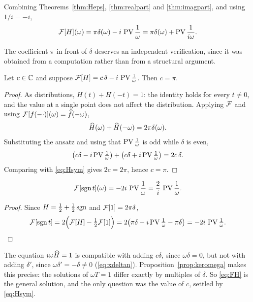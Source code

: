 Combining Theorems~\ref{thm:Heps}, \ref{thm:realpart} and \ref{thm:imagpart}, and using
$1/i=-i$,
\begin{equation}
\mathcal{F}[H](\omega)=\pi\delta(\omega)-i\,\operatorname{PV}\frac{1}{\omega}
=\pi\delta(\omega)+\operatorname{PV}\frac{1}{i\omega} .
\label{eq:FH}
\end{equation}

The coefficient $\pi$ in front of $\delta$ deserves an independent verification, since it was
obtained from a computation rather than from a structural argument.

\begin{theorem}\label{thm:symcoef}
Let $c\in\mathbb{C}$ and suppose $\mathcal{F}[H]=c\,\delta-i\,\operatorname{PV}\frac{1}{\omega}$. Then $c=\pi$.
\end{theorem}

\begin{proof}
As distributions, $H(t)+H(-t)=1$: the identity holds for every $t\neq0$, and the value at a single
point does not affect the distribution. Applying $\mathcal{F}$ and using
$\mathcal{F}[f(-\cdot)](\omega)=\widehat{f}(-\omega)$,
\begin{equation}
\widehat{H}(\omega)+\widehat{H}(-\omega)=2\pi\delta(\omega).
\label{eq:Hsym}
\end{equation}
Substituting the ansatz and using that $\operatorname{PV}\frac{1}{\omega}$ is odd while $\delta$ is even,
\begin{equation}
\big(c\delta-i\operatorname{PV}\tfrac{1}{\omega}\big)+\big(c\delta+i\operatorname{PV}\tfrac{1}{\omega}\big)=2c\,\delta .
\end{equation}
Comparing with \eqref{eq:Hsym} gives $2c=2\pi$, hence $c=\pi$.
\end{proof}

\begin{corollary}\label{cor:sgn}
\begin{equation}
\mathcal{F}[\operatorname{sgn} t](\omega)=-2i\,\operatorname{PV}\frac{1}{\omega}=\frac{2}{i}\,\operatorname{PV}\frac{1}{\omega} .
\label{eq:sgn}
\end{equation}
\end{corollary}

\begin{proof}
Since $H=\tfrac12+\tfrac12\operatorname{sgn}$ and $\mathcal{F}[1]=2\pi\delta$,
\begin{equation}
\mathcal{F}[\operatorname{sgn} t]=2\Big(\mathcal{F}[H]-\tfrac12\mathcal{F}[1]\Big)
=2\big(\pi\delta-i\operatorname{PV}\tfrac{1}{\omega}-\pi\delta\big)
=-2i\,\operatorname{PV}\tfrac{1}{\omega}. \qedhere
\end{equation}
\end{proof}

\begin{remark}
The equation $i\omega\widehat{H}=1$ is compatible with adding $c\delta$, since $\omega\delta=0$, but not
with adding $\delta'$, since $\omega\delta'=-\delta\neq0$
(\eqref{eq:xdeltan}). Proposition~\ref{prop:keromega} makes this precise: the solutions of
$\omega T=1$ differ exactly by multiples of $\delta$. So \eqref{eq:FH} is the general solution, and
the only question was the value of $c$, settled by \eqref{eq:Hsym}.
\end{remark}

